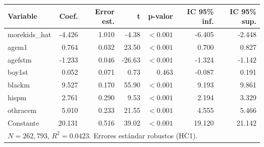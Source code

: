 
\begin{tabular}{lrrrrrr}
\toprule
Variable & Coef. & Error est. & t & p-valor & IC 95\% inf. & IC 95\% sup.\\
\midrule
morekids\_hat & -4.426 & 1.010 & -4.38 & $<0.001$ & -6.405 & -2.448\\
agem1 & 0.764 & 0.032 & 23.50 & $<0.001$ & 0.700 & 0.827\\
agefstm & -1.233 & 0.046 & -26.63 & $<0.001$ & -1.324 & -1.142\\
boy1st & 0.052 & 0.071 & 0.73 & 0.463 & -0.087 & 0.191\\
blackm & 9.527 & 0.170 & 55.90 & $<0.001$ & 9.193 & 9.861\\
hispm & 2.761 & 0.290 & 9.53 & $<0.001$ & 2.194 & 3.329\\
othracem & 5.010 & 0.233 & 21.55 & $<0.001$ & 4.555 & 5.466\\
Constante & 20.131 & 0.516 & 39.02 & $<0.001$ & 19.120 & 21.142\\
\midrule
\multicolumn{7}{l}{$N=262{,}793$, $R^2=0.0423$. Errores estándar robustos (HC1).}\\
\bottomrule
\end{tabular}
